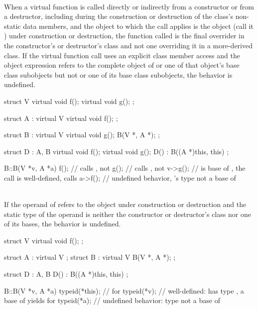 {\pnum
{} \\
When a virtual function is called directly or indirectly from a constructor or from a destructor,
including during the construction or destruction of the class's non-static data members, and the object to
which the call applies is the object (call it ) under construction or destruction, the function called is the
final overrider in the constructor's or destructor's class and not one overriding it in a more-derived class.
If the virtual function call uses an explicit class member access  and the object expression refers
to the complete object of  or one of that object's base class subobjects but not  or one of its base class
subobjects, the behavior is undefined.

\pnum
\begin{example}
\begin{codeblock}
struct V {
  virtual void f();
  virtual void g();
};

struct A : virtual V {
  virtual void f();
};

struct B : virtual V {
  virtual void g();
  B(V *, A *);
};

struct D : A, B {
  virtual void f();
  virtual void g();
  D() : B((A *)this, this) {}
};

B::B(V *v, A *a) {
  f();          // calls , not 
  g();          // calls , not 
  v->g();       //  is base of , the call is well-defined, calls 
  a->f();       // undefined behavior, 's type not a base of 
}
\end{codeblock}
\end{example}


\pnum
{} \\
If the operand of  refers to
the object under construction or destruction and the static type of the operand is neither the constructor or
destructor's class nor one of its bases, the behavior is undefined.

\pnum
\begin{example}
\begin{codeblock}
struct V {
  virtual void f();
};

struct A : virtual V {};
struct B : virtual V {
  B(V *, A *);
};

struct D : A, B {
  D() : B((A *)this, this) {}
};

B::B(V *v, A *a) {
  typeid(*this);        //  for 
  typeid(*v);           // well-defined:  has type , a base of  yields  for 
  typeid(*a);           // undefined behavior: type  not a base of 
}
\end{codeblock}
\end{example}


}

